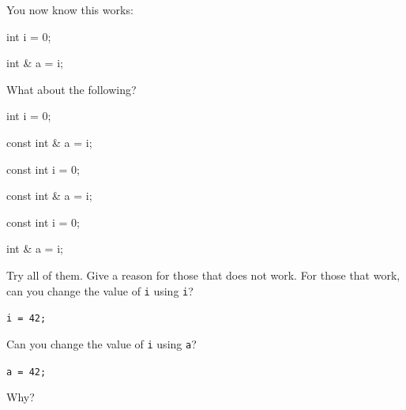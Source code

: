 You now know this works:



\begin{consolethree}[escapeinside=||]

int i = 0;

int & a = i;

\end{consolethree}



What about the following?



\begin{consolethree}[escapeinside=||]

int i = 0;

const int & a = i;

\end{consolethree}



\begin{consolethree}[escapeinside=||]

const int i = 0;

const int & a = i;

\end{consolethree}



\begin{consolethree}[escapeinside=||]

const int i = 0;

int & a = i;

\end{consolethree}



Try all of them. Give a reason for those that does not work. For those that work, can you change the value of \texttt{i} using \texttt{i}?



\verb!i = 42;!



Can you change the value of \texttt{i} using \texttt{a}?



\verb!a = 42;!



Why?


